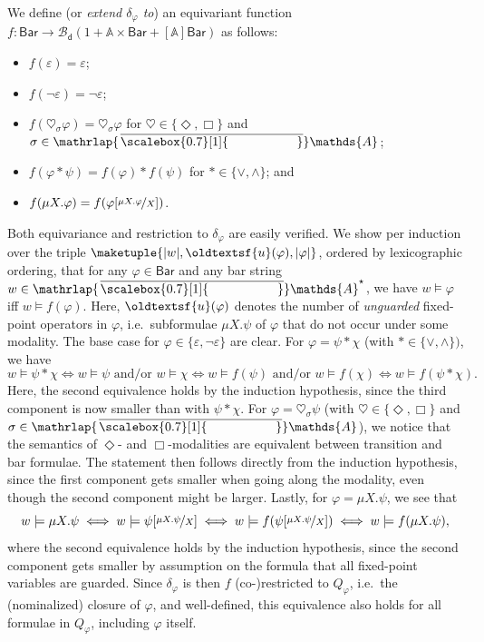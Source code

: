 \documentclass[10pt,a4paper]{amsart}
\theoremstyle{definition}
\renewcommand{\textsf}[1]{{\oldtextsf{\small#1}}}
\newcommand{\At}{\mathds{A}}
\newcommand{\barAs}{\barNames^{\star}}
\newcommand{\card}[1]{\left\vert#1\right\vert}
\newcommand{\allbool}{\mathcal{B}}
\newcommand{\dualbool}{\allbool_\mathsf{d}}
\newcommand{\names}{\At}
\newcommand{\Abstr}[2][\names]{[#1]#2}
\newcommand{\set}[1]{\{#1\}}
\newcommand{\mybar}[3]{%
  \mathrlap{\hspace{#2}\overline{\scalebox{#1}[1]{\phantom{\ensuremath{#3}}}}}\ensuremath{#3}
}
\newcommand{\BarForm}{\mathsf{Bar}}
\newcommand{\barNames}{{\mybar{0.7}{1.25pt}{\names}}}
\let\originalleft\left
\let\originalright\right
\renewcommand{\left}{\mathopen{}\mathclose\bgroup\originalleft}
\renewcommand{\right}{\aftergroup\egroup\originalright}
\begin{document}
\begin{IEEEproof}
  We define (or \emph{extend $\delta_\varphi$ to}) an equivariant function $f\colon \BarForm \to \dualbool(1 +
  \names \times \BarForm + \Abstr{\BarForm})$ as follows:
  \begin{itemize}
    \item $f(\varepsilon) = \varepsilon$;
    \item $f(\neg\varepsilon) = \neg\varepsilon$;
    \item $f(\heartsuit_\sigma \varphi) = \heartsuit_\sigma \varphi$ for $\heartsuit \in \set{\Diamond, \Box}$ and
      $\sigma \in \barNames$;
    \item $f(\varphi \ast \psi) = f(\varphi) \ast f(\psi)$ for $\ast \in \set{\vee, \wedge}$; and
    \item $f(\mu X. \varphi) = f(\varphi[\nicefrac{\mu X.\varphi}{X}])$.
  \end{itemize}
  Both equivariance and restriction to $\delta_\varphi$ are easily verified. We show per induction over the triple
  $\maketuple{\card{w}, \textsf{u}(\varphi), \card{\varphi}}$, ordered by lexicographic ordering, that for any
  $\varphi \in \BarForm$ and any bar string $w \in \barAs$, we have $w \models \varphi$ iff $w \models f(\varphi)$.
  Here, $\textsf{u}(\varphi)$ denotes the number of \emph{unguarded} fixed-point operators in $\varphi$,
  i.e.~subformulae $\mu X. \psi$ of $\varphi$ that do not occur under some modality.
  The base case for $\varphi \in \set{\varepsilon, \neg\varepsilon}$ are clear.
  For $\varphi = \psi \ast \chi$ (with $\ast \in \set{\vee, \wedge})$, we have
  \[ w \models \psi \ast \chi \iff w \models \psi \text{ and/or } w \models \chi \iff w \models f(\psi)
  \text{ and/or } w \models f(\chi) \iff w \models f(\psi \ast \chi). \]
  Here, the second equivalence holds by the induction hypothesis, since the third component is now smaller than
  with $\psi \ast \chi$.
  For $\varphi = \heartsuit_\sigma \psi$ (with $\heartsuit \in \set{\Diamond, \Box}$ and
  $\sigma \in \barNames$), we notice that the semantics of $\Diamond$- and $\Box$-modalities are equivalent
  between transition and bar formulae. The statement then follows directly from the induction
  hypothesis, since the first component gets smaller when going along the modality, even though the second
  component might be larger.
  Lastly, for $\varphi = \mu X. \psi$, we see that
  \[ w \models \mu X. \psi \iff w \models \psi[\nicefrac{\mu X.\psi}{X}] \iff 
    w \models f(\psi[\nicefrac{\mu X.\psi}{X}]) \iff w \models f(\mu X. \psi), \]
  where the second equivalence holds by the induction hypothesis, since the second component gets smaller
  by assumption on the formula that all fixed-point variables are guarded.
  Since $\delta_\varphi$ is then $f$ (co-)restricted to $Q_\varphi$, i.e.~the (nominalized) closure of $\varphi$, and
  well-defined, this equivalence also holds for all formulae in $Q_\varphi$, including $\varphi$ itself.
\end{IEEEproof}
\end{document}
